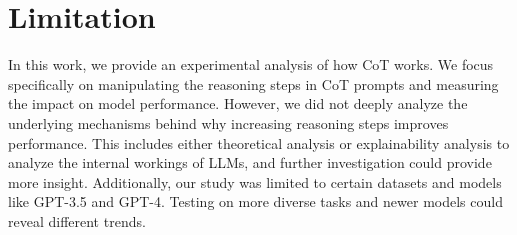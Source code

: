 \documentclass[11pt]{article}
\begin{document}
\section{Limitation}
%
In this work, we provide an experimental analysis of how CoT works. We focus specifically on manipulating the reasoning steps in CoT prompts and measuring the impact on model performance. However, we did not deeply analyze the underlying mechanisms behind why increasing reasoning steps improves performance. This includes either theoretical analysis or explainability analysis to analyze the internal workings of LLMs, and further investigation could provide more insight. Additionally, our study was limited to certain datasets and models like GPT-3.5 and GPT-4. Testing on more diverse tasks and newer models could reveal different trends.


\clearpage
\appendix

\onecolumn
\end{document}

